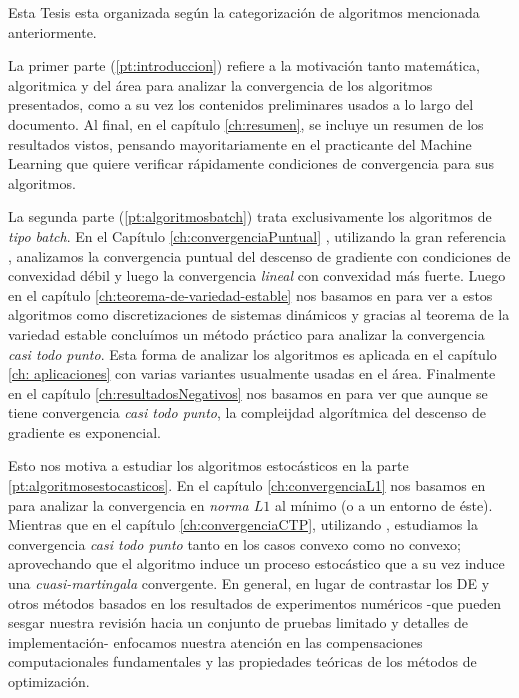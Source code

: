 Esta Tesis esta organizada seg\'un la categorizaci\'on de algoritmos mencionada anteriormente.

La primer parte (\ref{pt:introduccion}) refiere a la motivaci\'on tanto matem\'atica, algoritmica y del \'area para analizar la convergencia de los algoritmos presentados, como a su vez los contenidos preliminares usados a lo largo del documento. Al final, en el cap\'itulo \ref{ch:resumen}, se incluye un resumen de los resultados vistos, pensando mayoritariamente  en el practicante del Machine Learning que quiere verificar r\'apidamente condiciones de convergencia para sus algoritmos.

La segunda parte (\ref{pt:algoritmosbatch}) trata exclusivamente los algoritmos de \textit{tipo batch}. En el Cap\'itulo \ref{ch:convergenciaPuntual} , utilizando la gran referencia \cite{nesterov:2004}, analizamos la convergencia puntual del descenso de gradiente con condiciones de convexidad d\'ebil y luego la convergencia \textit{lineal} con convexidad m\'as fuerte. Luego en el cap\'itulo \ref{ch:teorema-de-variedad-estable} nos basamos en \cite{lee:2017} para ver a estos algoritmos como discretizaciones de sistemas din\'amicos y gracias al teorema de la variedad estable conclu\'imos un m\'etodo pr\'actico para analizar la convergencia \textit{casi todo punto}. Esta forma de analizar los algoritmos es aplicada en el cap\'itulo \ref{ch: aplicaciones} con varias variantes usualmente usadas en el \'area. Finalmente en el cap\'itulo \ref{ch:resultadosNegativos} nos basamos en \cite{du:2017} para ver que aunque se tiene convergencia \textit{casi todo punto}, la compleijdad algor\'itmica del descenso de gradiente es exponencial.

Esto nos motiva a estudiar los algoritmos estoc\'asticos en la parte \ref{pt:algoritmosestocasticos}. En el cap\'itulo \ref{ch:convergenciaL1} nos basamos en \cite{bottou:2016} para analizar la convergencia en \textit{norma $L1$} al m\'inimo (o a un entorno de \'este). Mientras que en el cap\'itulo \ref{ch:convergenciaCTP}, utilizando \cite{bottou:1999}, estudiamos la convergencia \textit{casi todo punto} tanto en los casos convexo como no convexo; aprovechando que el algoritmo induce un proceso estoc\'astico que a su vez induce una \textit{cuasi-martingala} convergente. En general, en lugar de contrastar los DE y otros m\'etodos basados en los resultados de experimentos num\'ericos -que pueden sesgar nuestra revisi\'on hacia un conjunto de pruebas limitado y detalles de implementaci\'on- enfocamos nuestra atenci\'on en las compensaciones computacionales fundamentales y las propiedades te\'oricas de los m\'etodos de optimizaci\'on.